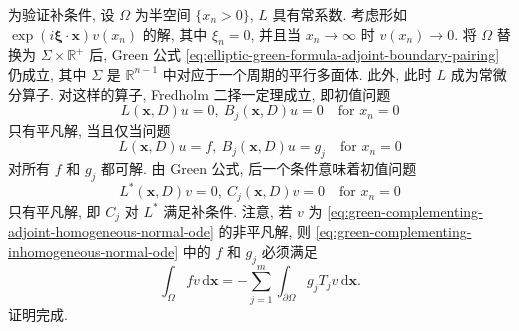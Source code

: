 \begin{Proof}
为验证补条件, 设 $\Omega$ 为半空间 $\{x_n>0\}$, $L$ 具有常系数. 考虑形如 $\exp(i\bm{\xi}\cdot\bm{x})v(x_n)$ 的解, 其中 $\xi_n=0$, 并且当 $x_n\to\infty$ 时 $v(x_n)\to0$. 将 $\Omega$ 替换为 $\Sigma\times\mathbb{R}^+$ 后, Green 公式 \eqref{eq:elliptic-green-formula-adjoint-boundary-pairing} 仍成立, 其中 $\Sigma$ 是 $\mathbb{R}^{n-1}$ 中对应于一个周期的平行多面体. 此外, 此时 $L$ 成为常微分算子. 对这样的算子, Fredholm 二择一定理成立, 即初值问题
\begin{equation}\label{eq:green-complementing-homogeneous-normal-ode}
L(\bm{x},D)u=0,\ B_j(\bm{x},D)u=0\quad\text{for }x_n=0
\end{equation}
只有平凡解, 当且仅当问题
\begin{equation}\label{eq:green-complementing-inhomogeneous-normal-ode}
L(\bm{x},D)u=f,\ B_j(\bm{x},D)u=g_j\quad\text{for }x_n=0
\end{equation}
对所有 $f$ 和 $g_j$ 都可解. 由 Green 公式, 后一个条件意味着初值问题
\begin{equation}\label{eq:green-complementing-adjoint-homogeneous-normal-ode}
L^*(\bm{x},D)v=0,\ C_j(\bm{x},D)v=0\quad\text{for }x_n=0
\end{equation}
只有平凡解, 即 $C_j$ 对 $L^*$ 满足补条件. 注意, 若 $v$ 为 \eqref{eq:green-complementing-adjoint-homogeneous-normal-ode} 的非平凡解, 则 \eqref{eq:green-complementing-inhomogeneous-normal-ode} 中的 $f$ 和 $g_j$ 必须满足
\begin{equation}\label{eq:green-adjoint-mode-data-compatibility}
\int_\Omega fv\,\mathrm{d}\bm{x}=-\sum_{j=1}^m\int_{\partial\Omega}g_jT_jv\,\mathrm{d}\bm{x}.
\end{equation}
证明完成.
\end{Proof}
